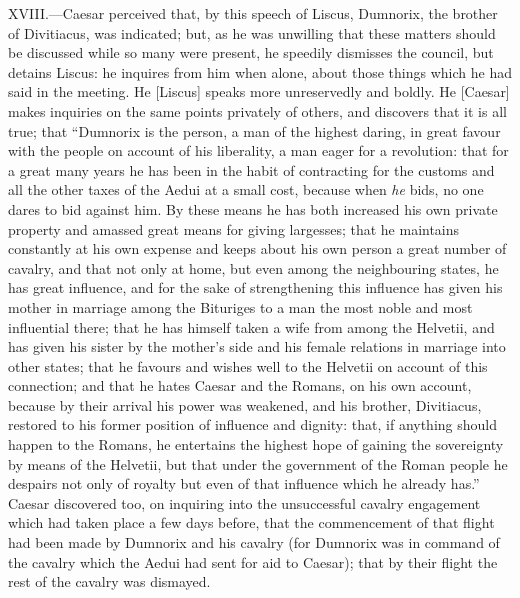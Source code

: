 XVIII.—Caesar perceived that, by this speech of Liscus, Dumnorix, the
brother of Divitiacus, was indicated; but, as he was unwilling that
these matters should be discussed while so many were present, he
speedily dismisses the council, but detains Liscus: he inquires from him
when alone, about those things which he had said in the meeting. He
[Liscus] speaks more unreservedly and boldly. He [Caesar] makes
inquiries on the same points privately of others, and discovers that it
is all true; that ``Dumnorix is the person, a man of the highest daring,
in great favour with the people on account of his liberality, a man
eager for a revolution: that for a great many years he has been in the
habit of contracting for the customs and all the other taxes of the
Aedui at a small cost, because when \emph{he} bids, no one dares to bid
against him. By these means he has both increased his own private
property and amassed great means for giving largesses; that he maintains
constantly at his own expense and keeps about his own person a great
number of cavalry, and that not only at home, but even among the
neighbouring states, he has great influence, and for the sake of
strengthening this influence has given his mother in marriage among the
Bituriges to a man the most noble and most influential there; that he
has himself taken a wife from among the Helvetii, and has given his
sister by the mother's side and his female relations in marriage into
other states; that he favours and wishes well to the Helvetii on account
of this connection; and that he hates Caesar and the Romans, on his own
account, because by their arrival his power was weakened, and his
brother, Divitiacus, restored to his former position of influence and
dignity: that, if anything should happen to the Romans, he entertains
the highest hope of gaining the sovereignty by means of the Helvetii,
but that under the government of the Roman people he despairs not only
of royalty but even of that influence which he already has.'' Caesar
discovered too, on inquiring into the unsuccessful cavalry engagement
which had taken place a few days before, that the commencement of that
flight had been made by Dumnorix and his cavalry (for Dumnorix was in
command of the cavalry which the Aedui had sent for aid to Caesar); that
by their flight the rest of the cavalry was dismayed.

